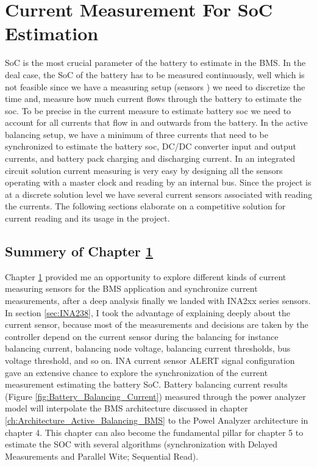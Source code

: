 \chapter{Current Measurement For SoC Estimation}\label{ch:Current_Measurement}
SoC is the most crucial parameter of the battery to estimate in the BMS. In the deal case, the SoC of the battery has to be measured continuously, well which is not feasible since we have a measuring setup (sensors ) we need to discretize the time and, measure how much current flows through the battery to estimate the soc. To be precise in the current measure to estimate battery soc we need to account for all currents that flow in and outwards from the battery. In the active balancing setup, we have a minimum of three currents that need to be synchronized to estimate the battery soc, DC/DC converter input and output currents, and battery pack charging and discharging current. In an integrated circuit solution current measuring is very easy by designing all the sensors operating with a master clock and reading by an internal bus. Since the project is at a discrete solution level we have several current sensors associated with reading the currents. The following sections elaborate on a competitive solution for current reading and its usage in the project.



\section{Summery of Chapter \ref{ch:Current_Measurement}}

Chapter \ref{ch:Current_Measurement} provided me an opportunity to explore different kinds of current measuring sensors for the BMS application and synchronize current measurements, after a deep analysis finally we landed with INA2xx series sensors. In section \ref{sec:INA238}, I took the advantage of explaining deeply about the current sensor, because most of the measurements and decisions are taken by the controller depend on the current sensor during the balancing for instance balancing current, balancing node voltage, balancing current thresholds, bus voltage threshold, and so on. INA current sensor ALERT signal configuration gave an extensive chance to explore the synchronization of the current measurement estimating the battery SoC. Battery balancing current results (Figure \ref{fig:Battery_Balancing_Current}) measured through the power analyzer model will interpolate the BMS architecture discussed in chapter \ref{ch:Architecture_Active_Balancing_BMS} to the Powel Analyzer architecture in chapter 4. This chapter can also become the fundamental pillar for chapter 5 to estimate the SOC with several algorithms (synchronization with Delayed Measurements and Parallel Wite; Sequential Read).